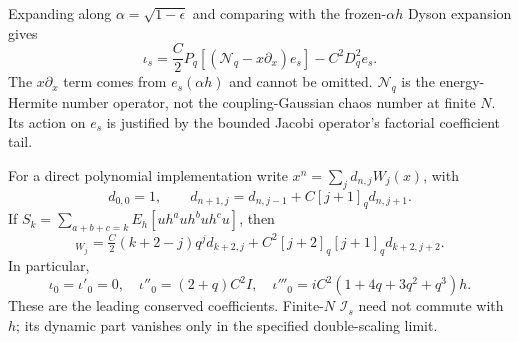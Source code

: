 \documentclass[11pt,a4paper]{article}
\begin{document}
Expanding along $\alpha=\sqrt{1-\epsilon}$ and comparing with the
frozen-$\alpha h$ Dyson expansion gives
\begin{equation}
 \boxed{\quad
 \iota_s=\frac C2P_q[(\mathcal N_q-x\partial_x)e_s]
                   -C^2D_q^2e_s.\quad}
 \label{eq:iota}
\end{equation}
The $x\partial_x$ term comes from $e_s(\alpha h)$ and cannot be
omitted. $\mathcal N_q$ is the energy-Hermite number operator,
not the coupling-Gaussian chaos number at finite $N$.
Its action on $e_s$ is justified by the bounded Jacobi operator's
factorial coefficient tail.

For a direct polynomial implementation write
$x^n=\sum_jd_{n,j}W_j(x)$, with
\begin{equation}
 d_{0,0}=1,\qquad d_{n+1,j}=d_{n,j-1}+C[j+1]_qd_{n,j+1}.
\end{equation}
If $S_k=\sum_{a+b+c=k}E_h[u h^a u h^b u h^c u]$, then
\begin{equation}
 [S_k]_{W_j}=\tfrac C2(k+2-j)q^j d_{k+2,j}
            +C^2[j+2]_q[j+1]_q d_{k+2,j+2}.
\end{equation}
In particular,
\begin{equation}
 \iota_0=\iota'_0=0,\quad \iota''_0=(2+q)C^2I,\quad
 \iota'''_0=iC^2(1+4q+3q^2+q^3)h.
\end{equation}
These are the leading conserved coefficients. Finite-$N$ $\mathcal I_s$
need not commute with $h$; its dynamic part vanishes only in the
specified double-scaling limit.

\newpage
\end{document}
